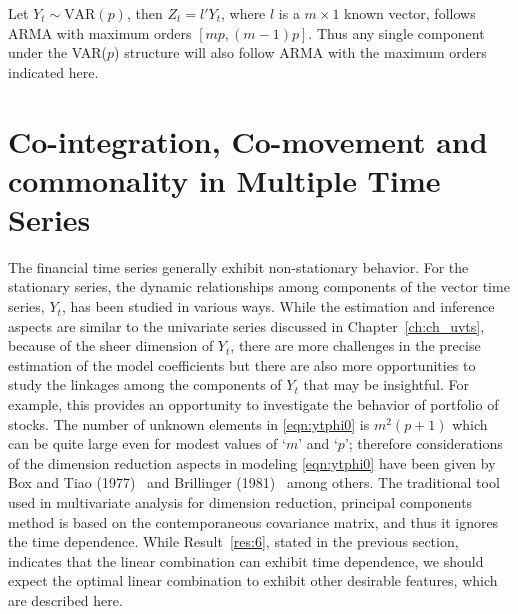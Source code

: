 \begin{result} \label{res:6} 
Let $Y_t \sim \text{VAR}(p)$, then $Z_t= l' Y_t$, where $l$ is a $m \times 1$ known vector, follows ARMA with maximum orders $[mp, (m-1)p]$. Thus any single component under the VAR($p$) structure will also follow ARMA with the maximum orders indicated here.
\end{result}



\section{Co-integration, Co-movement and commonality in Multiple Time Series \label{sec:comts}}


The financial time series generally exhibit non-stationary behavior. For the stationary series, the dynamic relationships among components of the vector time series, $Y_t$, has been studied in various ways. While the estimation and inference aspects are similar to the univariate series discussed in Chapter~\ref{ch:ch_uvts}, because of the sheer dimension of $Y_t$, there are more challenges in the precise estimation of the model coefficients but there are also more opportunities to study the linkages among the components of $Y_t$ that may be insightful. For example, this provides an opportunity to investigate the behavior of portfolio of stocks. The number of unknown elements in \eqref{eqn:ytphi0} is $m^2 (p+1)$ which can be quite large even for modest values of `$m$' and `$p$'; therefore considerations of the dimension reduction aspects in modeling \eqref{eqn:ytphi0} have been given by Box and Tiao (1977)~\cite{box77} and Brillinger (1981)~\cite{brill81} among others. The traditional tool used in multivariate analysis for dimension reduction, principal components method is based on the contemporaneous covariance matrix, and thus it ignores the time dependence. While Result~\ref{res:6}, stated in the previous section, indicates that the linear combination can exhibit time dependence, we should expect the optimal linear combination to exhibit other desirable features, which are described here. 


